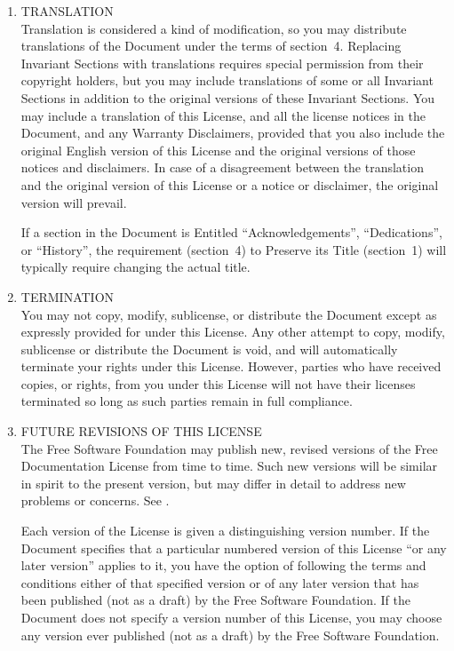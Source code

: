 \begin{enumerate}
\item TRANSLATION \\
  Translation is considered a kind of modification, so you may
  distribute translations of the Document under the terms of
  section~4.  Replacing Invariant Sections with translations requires
  special permission from their copyright holders, but you may include
  translations of some or all Invariant Sections in addition to the
  original versions of these Invariant Sections.  You may include a
  translation of this License, and all the license notices in the
  Document, and any Warranty Disclaimers, provided that you also
  include the original English version of this License and the
  original versions of those notices and disclaimers.  In case of a
  disagreement between the translation and the original version of
  this License or a notice or disclaimer, the original version will
  prevail.

  If a section in the Document is Entitled ``Acknowledgements'',
  ``Dedications'', or ``History'', the requirement (section~4) to
  Preserve its Title (section~1) will typically require changing the
  actual title.

\item TERMINATION \\
  You may not copy, modify, sublicense, or distribute the Document
  except as expressly provided for under this License.  Any other
  attempt to copy, modify, sublicense or distribute the Document is
  void, and will automatically terminate your rights under this
  License.  However, parties who have received copies, or rights, from
  you under this License will not have their licenses terminated so
  long as such parties remain in full compliance.

\item FUTURE REVISIONS OF THIS LICENSE \\
  The Free Software Foundation may publish new, revised versions of
  the  Free Documentation License from time to time.
  Such new versions will be similar in spirit to the present version,
  but may differ in detail to address new problems or concerns.  See
  .

  Each version of the License is given a distinguishing version
  number.  If the Document specifies that a particular numbered
  version of this License ``or any later version'' applies to it, you
  have the option of following the terms and conditions either of that
  specified version or of any later version that has been published
  (not as a draft) by the Free Software Foundation.  If the Document
  does not specify a version number of this License, you may choose
  any version ever published (not as a draft) by the Free Software
  Foundation.
\end{enumerate}
